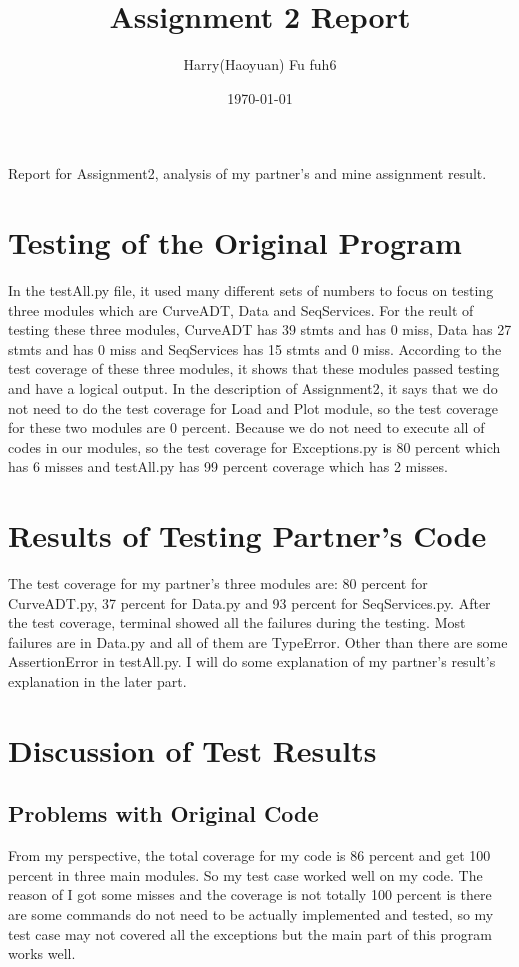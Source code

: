 \documentclass[12pt]{article}
\title{Assignment 2 Report}
\author{Harry(Haoyuan) Fu fuh6}
\date{\today}
\begin{document}
\maketitle

Report for Assignment2, analysis of my partner's and mine assignment result.  

\section{Testing of the Original Program}

In the testAll.py file, it used many different sets of numbers to focus on testing three modules which are CurveADT, Data and SeqServices. For the reult of testing these three modules, CurveADT has 39 stmts and has 0 miss, Data has 27 stmts and has 0 miss and SeqServices has 15 stmts and 0 miss. According to the test coverage of these three modules, it shows that these modules passed testing and have a logical output. In the description of Assignment2, it says that we do not need to do the test coverage for Load and Plot module, so the test coverage for these two modules are 0 percent. Because we do not need to execute all of codes in our modules, so the test coverage for Exceptions.py is 80 percent which has 6 misses and testAll.py has 99 percent coverage which has 2 misses.

\section{Results of Testing Partner's Code}

The test coverage for my partner's three modules are: 80 percent for CurveADT.py, 37 percent for Data.py and 93 percent for SeqServices.py. After the test coverage, terminal showed all the failures during the testing. Most failures are in Data.py and all of them are TypeError. Other than there are some AssertionError in testAll.py. I will do some explanation of my partner's result's explanation in the later part. 

\section{Discussion of Test Results}

\subsection{Problems with Original Code}
From my perspective, the total coverage for my code is 86 percent and get 100 percent in three main modules. So my test case worked well on my code. The reason of I got some misses and the coverage is not totally 100 percent is there are some commands do not need to be actually implemented and tested, so my test case may not covered all the exceptions but the main part of this program works well. 
\end{document}
